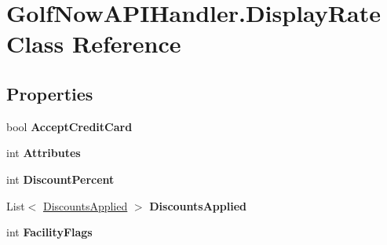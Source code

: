 \hypertarget{class_golf_now_a_p_i_handler_1_1_display_rate}{}\section{Golf\+Now\+A\+P\+I\+Handler.\+Display\+Rate Class Reference}
\label{class_golf_now_a_p_i_handler_1_1_display_rate}
\subsection*{Properties}
\begin{DoxyCompactItemize}
\item 
\mbox{\label{class_golf_now_a_p_i_handler_1_1_display_rate_ad504a6e9a0edd2b31fcf88f4199b10f2}} 
bool {\bfseries Accept\+Credit\+Card}
\item 
\mbox{\label{class_golf_now_a_p_i_handler_1_1_display_rate_a56abaa55a6126b55c4eefa660c884514}} 
int {\bfseries Attributes}
\item 
\mbox{\label{class_golf_now_a_p_i_handler_1_1_display_rate_a5e156366183f9a7df761b87b4253140c}} 
int {\bfseries Discount\+Percent}
\item 
\mbox{\label{class_golf_now_a_p_i_handler_1_1_display_rate_a6744563067cec068521d2d217572409b}} 
List$<$ \mbox{\hyperlink{class_golf_now_a_p_i_handler_1_1_discounts_applied}{Discounts\+Applied}} $>$ {\bfseries Discounts\+Applied}
\item 
\mbox{\label{class_golf_now_a_p_i_handler_1_1_display_rate_a80384741b4f36daed78e0e3897914276}} 
int {\bfseries Facility\+Flags}
\item 

\end{DoxyCompactItemize}

